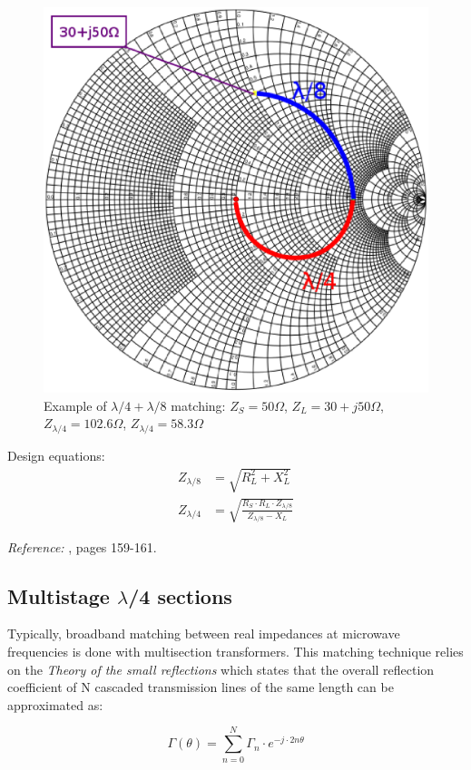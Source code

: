 \begin{figure}[H]
\centering
\includegraphics[width=120mm]{Smithl8l4}
\caption{Example of $\lambda/4 + \lambda/8$ matching: $Z_S = 50\Omega$, $Z_L = 30+j50\Omega$, $Z_{\lambda/4} = 102.6\Omega$, $Z_{\lambda/4} = 58.3\Omega$}
\label{fig:SmithL8L4}
\end{figure}


\noindent Design equations:
\begin{align}
Z_{\lambda/8} & = \sqrt{R_L^2 + X_L^2} \\
Z_{\lambda/4} & = \sqrt{\frac{R_S \cdot R_L \cdot Z_{\lambda/8}}{Z_{\lambda/8}-X_L}}
\end{align}


\noindent \textit{Reference:} \cite{BahlFundamentalsRFMW}, pages 159-161.


\subsection{Multistage $\lambda$/4 sections}
Typically, broadband matching between real impedances at microwave frequencies is done with multisection transformers. This matching technique relies on the \textit{Theory of the small reflections} which states that the overall reflection coefficient of N cascaded transmission lines of the same length can be approximated as:

\begin{equation}
\Gamma(\theta) = \sum \limits_{n=0}^{N} \Gamma_n \cdot e^{-j\cdot 2n \theta}
\label{eq:CascadeReflection}
\end{equation}

